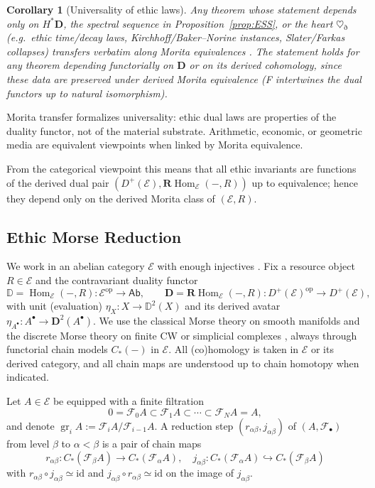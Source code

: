 \documentclass[12pt]{article}
\newcommand{\E}{\mathcal{E}}
\newcommand{\Ab}{\mathsf{Ab}}
\newcommand{\DD}{\mathbb{D}}
\newcommand{\Hom}{\operatorname{Hom}}
\newcommand{\id}{\mathrm{id}}
\newcommand{\op}{\mathrm{op}}
\newcommand{\RHom}{\mathbf{R}\!\operatorname{Hom}}
\theoremstyle{plain}
\newtheorem{corollary}[theorem]{Corollary}
\theoremstyle{definition}
\theoremstyle{remark}
\numberwithin{equation}{section}
\begin{document}
\begin{corollary}[Universality of ethic laws]\label{cor:Universality}
Any theorem whose statement depends only on \(H^\ast\mathbf D\), the spectral sequence in Proposition~\ref{prop:ESS}, or the heart \(\heartsuit_{\eth}\) (e.g.\ ethic time/decay laws, Kirchhoff/Baker--Norine instances, Slater/Farkas collapses) transfers verbatim along Morita equivalences \cite{Rickard1989,Toen2007}. The statement holds for any theorem depending functorially
on $\mathbf D$ or on its derived cohomology, since these data
are preserved under derived Morita equivalence (F intertwines
the dual functors up to natural isomorphism).
\end{corollary}

Morita transfer formalizes universality: ethic dual laws are properties of the duality functor, not of the material substrate. Arithmetic, economic, or geometric media are equivalent viewpoints when linked by Morita equivalence.

From the categorical viewpoint this means that all ethic invariants
are functions of the derived dual pair
$(D^+(\E),\RHom_\E(-,R))$ up to equivalence;
hence they depend only on the derived Morita class of $(\E,R)$.

\subsection{Ethic Morse Reduction}

We work in an abelian category \(\E\) with enough injectives \cite{Weibel1994}.  
Fix a resource object \(R\in\E\) and the contravariant duality functor
\[
\DD=\Hom_{\E}(-,R):\E^{\op}\to \Ab,
\qquad 
\mathbf D=\RHom_{\E}(-,R):D^{+}(\E)^{\op}\to D^{+}(\E),
\]
with unit (evaluation) \(\eta_X:X\to \DD^{2}(X)\) and its derived avatar \(\eta_{A^\bullet}:A^\bullet\to \mathbf D^{2}(A^\bullet)\).
We use the classical Morse theory on smooth manifolds \cite{Milnor1963} and the discrete Morse theory on finite CW or simplicial complexes \cite{Forman1998}, always through functorial chain models \(C_\ast(-)\) in \(\E\).  All (co)homology is taken in \(\E\) or its derived category, and all chain maps are understood up to chain homotopy when indicated.
 
Let \(A\in \E\) be equipped with a finite filtration
\[
0=\mathcal F_{0}A \subset \mathcal F_{1}A \subset \cdots \subset \mathcal F_{N}A=A,
\]
and denote \( \operatorname{gr}_{i}A:=\mathcal F_{i}A/\mathcal F_{i-1}A\).
A reduction step \((r_{\alpha\beta},j_{\alpha\beta})\) of \((A,\mathcal F_\bullet)\) from level \(\beta\) to \(\alpha<\beta\) is a pair of chain maps
\[
r_{\alpha\beta}:C_\ast(\mathcal F_{\beta}A)\to C_\ast(\mathcal F_{\alpha}A),
\quad
j_{\alpha\beta}:C_\ast(\mathcal F_{\alpha}A)\hookrightarrow C_\ast(\mathcal F_{\beta}A)
\]
with \(r_{\alpha\beta}\circ j_{\alpha\beta}\simeq \id\) and \(j_{\alpha\beta}\circ r_{\alpha\beta}\simeq \id\) on the image of \(j_{\alpha\beta}\).
\end{document}
